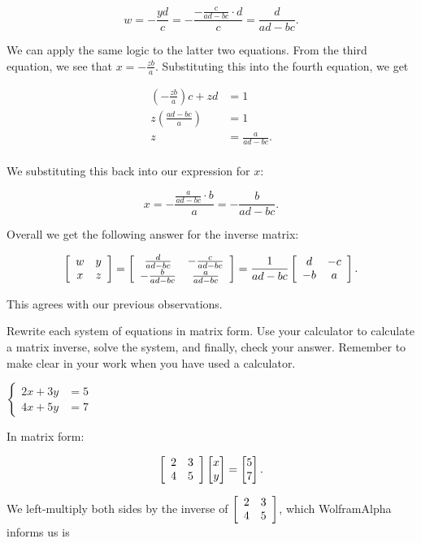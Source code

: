 \documentclass[../key.tex]{subfiles}
\begin{document}
$$w=-\frac{yd}{c}=-\frac{-\frac{c}{ad-bc}\cdot d}{c} = \frac{d}{ad-bc}.$$

We can apply the same logic to the latter two equations. From the third equation, we see that $x = -\frac{zb}{a}$. Substituting this into the fourth equation, we get

\begin{align*}
  \left(-\frac{zb}{a}\right)c+zd &= 1 \\
  z\left(\frac{ad-bc}{a}\right) &= 1 \\
  z &= \frac{a}{ad-bc}. \\
\end{align*}

We substituting this back into our expression for $x$:

$$x = -\frac{\frac{a}{ad-bc}\cdot b}{a} = -\frac{b}{ad-bc}.$$

Overall we get the following answer for the inverse matrix:

$$\left[\begin{array}{cc} w & y \\ x & z \end{array}\right] = \left[\begin{array}{cc} \frac{d}{ad-bc} & -\frac{c}{ad-bc} \\ -\frac{b}{ad-bc} & \frac{a}{ad-bc} \end{array}\right] = \frac{1}{ad-bc}\left[\begin{array}{cc} d & -c \\ -b & a \end{array}\right].$$

This agrees with our previous observations.

\begin{outer_problem}
\item Rewrite each system of equations in matrix form. Use your calculator to calculate a matrix inverse, solve the system, and finally, check your answer. Remember to make clear in your work when you have used a calculator.
\end{outer_problem}

\begin{inner_problem}[start=1]
\item $\begin{cases} 2x+3y &= 5 \\ 4x+5y &= 7 \end{cases}$
\end{inner_problem}

In matrix form:

$$\left[\begin{array}{cc} 2 & 3 \\ 4 & 5 \end{array}\right]\begin{bmatrix} x \\ y \end{bmatrix} = \begin{bmatrix} 5 \\ 7 \end{bmatrix}.$$

We left-multiply both sides by the inverse of $\left[\begin{array}{cc} 2 & 3 \\ 4 & 5 \end{array}\right]$, which WolframAlpha informs us is
\end{document}

